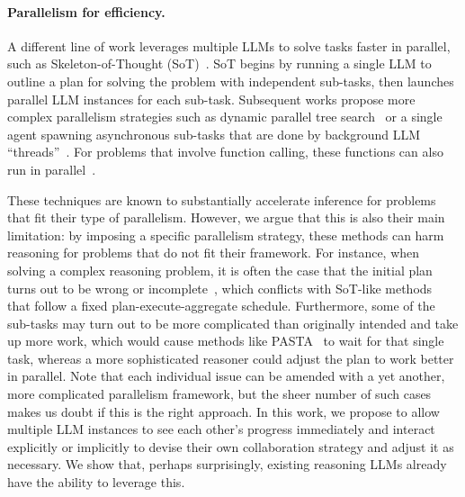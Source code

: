 \paragraph{Parallelism for efficiency.} A different line of work leverages multiple LLMs to solve tasks faster in parallel, such as Skeleton-of-Thought (SoT)~\citep{ning2024skeletonofthought}. SoT begins by running a single LLM to outline a plan for solving the problem with independent sub-tasks, then launches parallel LLM instances for each sub-task. Subsequent works propose more complex parallelism strategies such as dynamic parallel tree search~\citep{ding2025dynamicparalleltreesearch} or a single agent spawning asynchronous sub-tasks that are done by background LLM ``threads''~\citep{jin2025learningpromisescalinglanguage}. For problems that involve function calling, these functions can also run in parallel~\citep{kim2024llm,gim2024asynchronousllmfunctioncalling}.

These techniques are known to substantially accelerate inference for problems that fit their type of parallelism. However, we argue that this is also their main limitation: by imposing a specific parallelism strategy, these methods can harm reasoning for problems that do not fit their framework. For instance, when solving a complex reasoning problem, it is often the case that the initial plan turns out to be wrong or incomplete~\citep{muennighoff2025s1,deepseek_r1}, which conflicts with SoT-like methods~\citep{ning2024skeletonofthought,yu2025accelerateparallelizablereasoningparallel} that follow a fixed plan-execute-aggregate schedule. Furthermore, some of the sub-tasks may turn out to be more complicated than originally intended and take up more work, which would cause methods like PASTA~\cite{jin2025learningpromisescalinglanguage} to wait for that single task, whereas a more sophisticated reasoner could adjust the plan to work better in parallel. Note that each individual issue can be amended with a yet another, more complicated parallelism framework, but the sheer number of such cases makes us doubt if this is the right approach. In this work, we propose to allow multiple LLM instances to see each other's progress immediately and interact explicitly or implicitly to devise their own collaboration strategy and adjust it as necessary. We show that, perhaps surprisingly, existing reasoning LLMs already have the ability to leverage this. 

